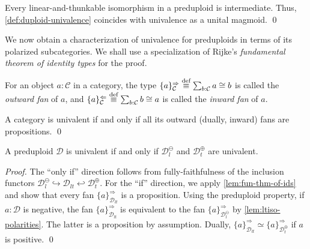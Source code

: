 \documentclass[runningheads]{llncs}
\makeatletter
\newcommand*{\chap}{Ch.\@}
\newcommand*\rocqlogo{\usebox{\rocqlogobox}}
\newcommand{\lemmaref}[3]{\href{https://github.com/UniMath/UniMath/blob/94fae0eda57a778cec704bfa73b4ff525c9bc475/#1\#L#2?name=#3}{\rocqlogo}}
\newcommand{\acat}[1]{\mathcal{#1}}
\newcommand{\C}{\acat{C}}
\newcommand{\D}{\acat{D}}
\newcommand{\Cl}[1]{#1_l}
\newcommand{\Ct}[1]{#1_t}
\newcommand{\Clt}[1]{#1_{lt}}
\newcommand{\Cn}[1]{#1^\ominus}
\newcommand{\Cp}[1]{#1^\oplus}
\newcommand{\Cnl}[1]{\Cn{\Cl{#1}}}
\newcommand{\Cpt}[1]{\Cp{\Ct{#1}}}
\newcommand{\defequiv}{\overset{\mathrm{\textup{def}}}{\equiv}}
\newcommand{\ofan}[2]{\{#2\}^{{\Rightarrow}}_{#1}}
\newcommand{\ifan}[2]{\{#2\}^{{\Leftarrow}}_{#1}}
\makeatother
\begin{document}
\begin{corollary}[{\lemmaref{UniMath/CategoryTheory/Nonassociative/Duploids/Univalence.v}{67}{is\_um\_univalent\_preduploid\_iff}}]
\label{lem:preduploid-lt-iso-intermediate}
Every linear\hyp{}and\hyp{}thunkable isomorphism in a preduploid is
intermediate. Thus, \autoref{def:duploid-univalence} coincides with univalence as
a unital magmoid.
\qed
\end{corollary}

We now obtain a characterization of univalence for preduploids in
terms of its polarized subcategories. We shall use a specialization of
Rijke's \emph{fundamental theorem of identity types} \cite{Rijke25} for
the proof.

\begin{definition}[{\lemmaref{UniMath/IdentitySystems/RXGraph.v}{99}{edges\_from}}]
\label{def:fans}
For an object \(a : \C\) in a category, the type \(\ofan\C{a}
\defequiv \sum_{b:\C} a \cong b\) is called the \emph{outward fan} of
\(a\), and \(\ifan\C{a} \defequiv \sum_{b:\C} b \cong a\) is called
the \emph{inward fan} of \(a\).
\end{definition}

\begin{theorem}[{\lemmaref{UniMath/IdentitySystems/RXGraph.v}{136}{is\_univalent\_from\_isaprop\_edges\_from} \cite[\chap{} 11]{Rijke25}}]
\label{lem:fun-thm-of-ids}
A category is univalent if and only if all its outward (dually,
inward) fans are propositions.
\qed
\end{theorem}

\begin{theorem}[{\lemmaref{UniMath/CategoryTheory/Nonassociative/Duploids/Univalence.v}{692}{is\_dupl\_univalent\_from\_polarized}}]
\label{thm:duploid-univ-of-subcats}
A preduploid \(\D\) is univalent if and only if \(\Cnl\D\) and
\(\Cpt\D\) are univalent.
\end{theorem}
\begin{proof}
The ``only if'' direction follows from fully\hyp{}faithfulness of the
inclusion functors \(\Cnl\D \hookrightarrow \Clt\D \hookleftarrow
\Cpt\D\).  For the ``if'' direction, we apply \autoref{lem:fun-thm-of-ids} and
show that every fan \(\ofan{\Clt\D}{a}\) is a proposition. Using the preduploid
property, if \(a : \D\) is negative, the fan \(\ofan{\Clt\D}{a}\) is
equivalent to the fan \(\ofan{\Cnl\D}{a}\) by \autoref{lem:ltiso-polarities}.
The latter is a proposition by assumption. Dually, \(\ofan{\Clt\D}{a} \simeq
\ofan{\Cpt\D}{a}\) if \(a\) is positive.
\qed
\end{proof}
\end{document}
